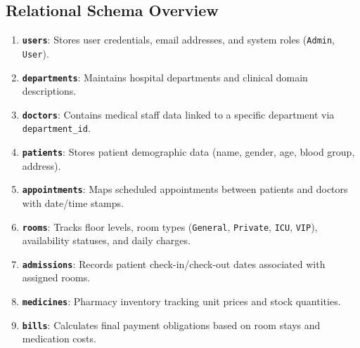 \documentclass[12pt, a4paper]{article}
\begin{document}
\subsection{Relational Schema Overview}
\begin{enumerate}
    \item \textbf{\texttt{users}}: Stores user credentials, email addresses, and system roles (\texttt{Admin}, \texttt{User}).
    \item \textbf{\texttt{departments}}: Maintains hospital departments and clinical domain descriptions.
    \item \textbf{\texttt{doctors}}: Contains medical staff data linked to a specific department via \texttt{department\_id}.
    \item \textbf{\texttt{patients}}: Stores patient demographic data (name, gender, age, blood group, address).
    \item \textbf{\texttt{appointments}}: Maps scheduled appointments between patients and doctors with date/time stamps.
    \item \textbf{\texttt{rooms}}: Tracks floor levels, room types (\texttt{General}, \texttt{Private}, \texttt{ICU}, \texttt{VIP}), availability statuses, and daily charges.
    \item \textbf{\texttt{admissions}}: Records patient check-in/check-out dates associated with assigned rooms.
    \item \textbf{\texttt{medicines}}: Pharmacy inventory tracking unit prices and stock quantities.
    \item \textbf{\texttt{bills}}: Calculates final payment obligations based on room stays and medication costs.
\end{enumerate}
\end{document}
